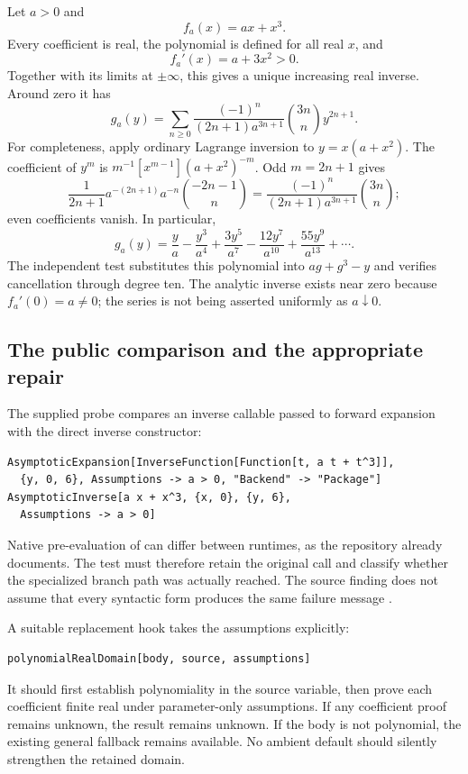 \documentclass[11pt,a4paper]{article}
\newcommand{\code}[1]{\texttt{\detokenize{#1}}}
\theoremstyle{remark}
\begin{document}
Let $a>0$ and
\begin{equation}\label{eq:cubic}
 f_a(x)=ax+x^3.
\end{equation}
Every coefficient is real, the polynomial is defined for all real $x$, and
\[
 f_a'(x)=a+3x^2>0.
\]
Together with its limits at $\pm\infty$, this gives a unique increasing real inverse. Around zero it has
\begin{equation}\label{eq:cubicinverse}
 g_a(y)=\sum_{n\ge0}
 \frac{(-1)^n}{(2n+1)a^{3n+1}}\binom{3n}{n}y^{2n+1}.
\end{equation}
For completeness, apply ordinary Lagrange inversion to $y=x(a+x^2)$. The coefficient of $y^m$ is $m^{-1}[x^{m-1}](a+x^2)^{-m}$. Odd $m=2n+1$ gives
\[
 \frac1{2n+1}a^{-(2n+1)}a^{-n}
 \binom{-2n-1}{n}
 =\frac{(-1)^n}{(2n+1)a^{3n+1}}\binom{3n}{n};
\]
even coefficients vanish. In particular,
\[
 g_a(y)=\frac ya-\frac{y^3}{a^4}+\frac{3y^5}{a^7}
 -\frac{12y^7}{a^{10}}+\frac{55y^9}{a^{13}}+\cdots.
\]
The independent test substitutes this polynomial into $ag+g^3-y$ and verifies cancellation through degree ten. The analytic inverse exists near zero because $f_a'(0)=a\ne0$; the series is not being asserted uniformly as $a\downarrow0$.

\subsection{The public comparison and the appropriate repair}

The supplied probe compares an inverse callable passed to forward expansion with the direct inverse constructor:
\begin{lstlisting}
AsymptoticExpansion[InverseFunction[Function[t, a t + t^3]],
  {y, 0, 6}, Assumptions -> a > 0, "Backend" -> "Package"]
AsymptoticInverse[a x + x^3, {x, 0}, {y, 6},
  Assumptions -> a > 0]
\end{lstlisting}
Native pre-evaluation of \code{InverseFunction} can differ between runtimes, as the repository already documents. The test must therefore retain the original call and classify whether the specialized branch path was actually reached. The source finding does not assume that every syntactic form produces the same failure message \cite{callables,inverseexpressions}.

A suitable replacement hook takes the assumptions explicitly:
\begin{lstlisting}
polynomialRealDomain[body, source, assumptions]
\end{lstlisting}
It should first establish polynomiality in the source variable, then prove each coefficient finite real under parameter-only assumptions. If any coefficient proof remains unknown, the result remains unknown. If the body is not polynomial, the existing general fallback remains available. No ambient default should silently strengthen the retained domain.
\end{document}
